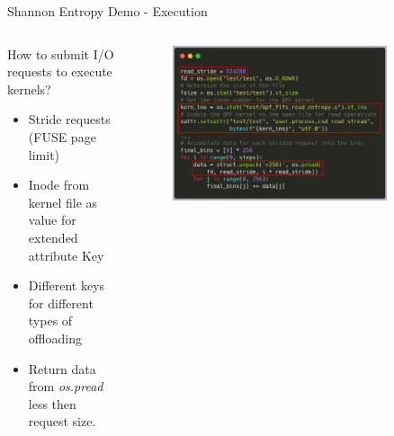 \documentclass[aspectratio=169]{beamer}
\begin{document}
\begin{frame}{Shannon Entropy Demo - Execution}
    \begin{columns}
        \begin{column}{0.40\textwidth}
            \footnotesize
            How to submit I/O requests to execute kernels?
            \begin{itemize}
                \item Stride requests (FUSE page limit)
                \item Inode from kernel file as value for extended attribute
                      Key
                \item Different keys for different types of offloading
                \item Return data from \textit{os.pread} less then request
                      size.
            \end{itemize}
        \end{column}
        \begin{column}{0.60\textwidth}
            \begingroup
            \small
            \begin{figure}
                \centering
                \includegraphics[width=0.85\textwidth]{resources/images/python-kernel-carbon2.png}
            \end{figure}
            \endgroup
        \end{column}
    \end{columns}
\end{frame}
\end{document}
